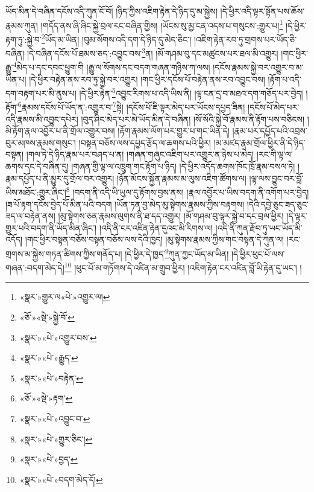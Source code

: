 ཡོད་མིན་དེ་བཞིན་དངོས་འདི་ཀུན་ངོ་བོ། །ཉིད་ཀྱིས་འཇིག་རྟེན་དེ་ཉིད་དུ་མ་སྐྱེས། །དེ་ཕྱིར་འདི་ལྟར་སྟོན་པས་ཆོས་རྣམས་ཀུན། །གདོད་ནས་ཞི་ཞིང་སྐྱེ་བྲལ་རང་བཞིན་གྱིས། །ཡོངས་སུ་མྱ་ངན་འདས་པ་གསུངས་:གྱུར་པ།\footnote{«སྣར་»གྱུར་ལ«པེ་»འགྱུར་ལ།} །དེ་ཕྱིར་རྟག་ཏུ་:སྐྱེ་བ་\footnote{«ཅོ་»«སྡེ་»སྐྱེ་བོ་}ཡོད་མ་ཡིན། །བུམ་སོགས་འདི་དག་དེ་ཉིད་དུ་མེད་ཅིང་། །འཇིག་རྟེན་རབ་ཏུ་གྲགས་པར་ཡོད་ཅི་བཞིན། །དེ་བཞིན་དངོས་པོ་ཐམས་ཅད་:འབྱུང་བས་\footnote{«སྣར་»«པེ་»འགྱུར་བས་}ན། །མོ་གཤམ་བུ་དང་མཚུངས་པར་ཐལ་མི་འགྱུར། །གང་ཕྱིར་རྒྱུ་\footnote{«སྣར་»«པེ་»རྒྱུད་}མེད་པ་དང་དབང་ཕྱུག་གི །རྒྱུ་ལ་སོགས་དང་བདག་གཞན་གཉིས་ཀ་ལས། །དངོས་རྣམས་སྐྱེ་བར་འགྱུར་བ་མ་ཡིན་པ། །དེ་ཕྱིར་བརྟེན་ནས་རབ་ཏུ་སྐྱེ་བར་འགྱུར། །གང་ཕྱིར་དངོས་པོ་བརྟེན་ནས་རབ་འབྱུང་བས། །རྟོག་པ་འདི་དག་བརྟག་པར་མི་ནུས་པ། །དེ་ཕྱིར་རྟེན་\footnote{«སྣར་»«པེ་»བརྟེན་}འབྱུང་རིགས་པ་འདི་ཡིས་ནི། །ལྟ་ངན་དྲ་བ་མཐའ་དག་གཅོད་པར་བྱེད། །རྟོག་\footnote{«ཅོ་»«སྡེ་»རྟག་}རྣམས་དངོས་པོ་ཡོད་ན་:འགྱུར་བ་\footnote{«སྣར་»«པེ་»འབྱུང་བ་}སྟེ། །དངོས་པོ་ཇི་ལྟར་མེད་པར་ཡོངས་དཔྱད་ཟིན། །དངོས་པོ་མེད་པར་འདི་རྣམས་མི་འབྱུང་དཔེར། །བུད་ཤིང་མེད་པར་མེ་ཡོད་མིན་དེ་བཞིན། །སོ་སོའི་སྐྱེ་བོ་རྣམས་ནི་རྟོག་པས་བཅིངས། །མི་རྟོག་རྣལ་འབྱོར་པ་ནི་གྲོལ་འགྱུར་བས། །རྟོག་རྣམས་ལོག་པར་གྱུར་པ་གང་ཡིན་དེ། །རྣམ་པར་དཔྱོད་པའི་འབྲས་བུར་མཁས་རྣམས་གསུང་། །བསྟན་བཅོས་ལས་དཔྱད་རྩོད་ལ་ཆགས་པའི་ཕྱིར། །མ་མཛད་རྣམ་གྲོལ་ཕྱིར་ནི་དེ་ཉིད་བསྟན། །གལ་ཏེ་དེ་ཉིད་རྣམ་པར་བཤད་པ་ན། །གཞན་གཞུང་འཇིག་པར་འགྱུར་ན་ཉེས་པ་མེད། །རང་གི་ལྟ་ལ་ཆགས་དང་དེ་བཞིན་དུ། །གཞན་གྱི་ལྟ་ལ་འཁྲུག་གང་རྟོག་པ་ཉིད། །དེ་ཕྱིར་འདོད་ཆགས་ཁོང་ཁྲོ་རྣམ་བསལ་ཏེ། །རྣམ་དཔྱོད་པ་ནི་མྱུར་དུ་གྲོལ་བར་འགྱུར། །ཉོན་མོངས་སྐྱོན་རྣམས་མ་ལུས་འཇིག་ཚོགས་ལ། །ལྟ་ལས་བྱུང་བར་བློ་ཡིས་མཐོང་:གྱུར་ཞིང་།\footnote{«སྣར་»«པེ་»གྱུར་ཅིང་།} །བདག་ནི་འདི་ཡི་ཡུལ་དུ་རྟོགས་བྱས་ནས། །རྣལ་འབྱོར་པ་ཡིས་བདག་ནི་འགོག་པར་བྱེད། །ཟ་པོ་རྟག་དངོས་བྱེད་པོ་མིན་པའི་བདག །ཡོན་ཏན་བྱ་མེད་མུ་སྟེགས་རྣམས་ཀྱིས་བརྟགས། །དེའི་དབྱེ་ཅུང་ཟད་ཅུང་ཟད་ལ་བརྟེན་ནས། །མུ་སྟེགས་ཅན་རྣམས་ལུགས་ནི་ཐ་དད་འགྱུར། །མོ་གཤམ་བུ་ལྟར་སྐྱེ་བ་དང་བྲལ་ཕྱིར། །དེ་ལྟར་གྱུར་པའི་བདག་ནི་ཡོད་མིན་ཞིང་། །འདི་ནི་ངར་འཛིན་རྟེན་དུའང་མི་རིགས་ལ། །འདི་ནི་ཀུན་རྫོབ་ཏུ་ཡང་ཡོད་མི་འདོད། །གང་ཕྱིར་བསྟན་བཅོས་བསྟན་བཅོས་ལས་དེའི་ཁྱད། །མུ་སྟེགས་རྣམས་ཀྱིས་གང་བསྟན་དེ་ཀུན་ལ། །རང་གྲགས་མ་སྐྱེས་གཏན་ཚིགས་ཀྱིས་གནོད་པ། །དེ་ཕྱིར་དེ་ཁྱད་\footnote{«སྣར་»«པེ་»བྱད་}ཀུན་ཀྱང་ཡོད་མ་ཡིན། །དེ་ཕྱིར་ཕུང་པོ་ལས་གཞན་:བདག་མེད་དེ།\footnote{«སྣར་»«པེ་»བདག་མེད་དོ།} །ཕུང་པོ་མ་གཏོགས་དེ་འཛིན་མ་གྲུབ་ཕྱིར། །འཇིག་རྟེན་ངར་འཛིན་བློ་ཡི་རྟེན་དུ་ཡང་། །
